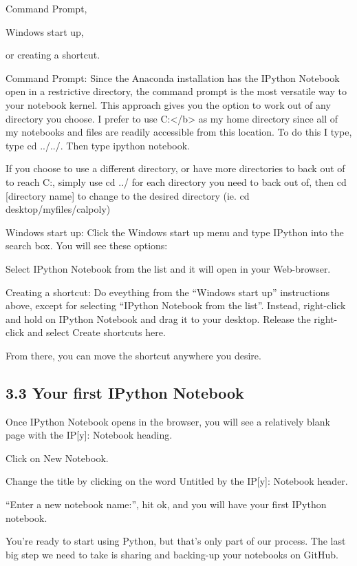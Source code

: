 \documentclass{article}
\begin{document}
Command Prompt,

Windows start up,

or creating a shortcut.

Command Prompt: Since the Anaconda installation has the IPython Notebook
open in a restrictive directory, the command prompt is the most
versatile way to your notebook kernel. This approach gives you the
option to work out of any directory you choose. I prefer to use
C:\textless{}/b\textgreater{} as my home directory since all of my
notebooks and files are readily accessible from this location. To do
this I type, type cd ../../. Then type ipython notebook.

If you choose to use a different directory, or have more directories to
back out of to reach C:, simply use cd ../ for each directory you need
to back out of, then cd {[}directory name{]} to change to the desired
directory (ie. cd desktop/myfiles/calpoly)

Windows start up: Click the Windows start up menu and type IPython into
the search box. You will see these options:

Select IPython Notebook from the list and it will open in your
Web-browser.

Creating a shortcut: Do eveything from the ``Windows start up''
instructions above, except for selecting ``IPython Notebook from the
list''. Instead, right-click and hold on IPython Notebook and drag it to
your desktop. Release the right-click and select Create shortcuts here.

From there, you can move the shortcut anywhere you desire.


    \subsection{3.3 Your first IPython Notebook}


    Once IPython Notebook opens in the browser, you will see a relatively
blank page with the IP{[}y{]}: Notebook heading.

Click on New Notebook.

Change the title by clicking on the word Untitled by the IP{[}y{]}:
Notebook header.

``Enter a new notebook name:'', hit ok, and you will have your first
IPython notebook.

You're ready to start using Python, but that's only part of our process.
The last big step we need to take is sharing and backing-up your
notebooks on GitHub.
\end{document}

